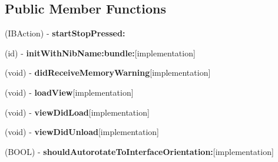 \subsection*{\-Public \-Member \-Functions}
\begin{DoxyCompactItemize}
\item 
\hypertarget{interface_main_interface_controller_a916520cdc378f7c0f7f7ee473eb60f58}{
(\-I\-B\-Action) -\/ {\bfseries start\-Stop\-Pressed\-:}}
\label{interface_main_interface_controller_a916520cdc378f7c0f7f7ee473eb60f58}

\item 
\hypertarget{interface_main_interface_controller_a595b629b86c323f97209d11c70c09a69}{
(id) -\/ {\bfseries init\-With\-Nib\-Name\-:bundle\-:}{\ttfamily  \mbox{[}implementation\mbox{]}}}
\label{interface_main_interface_controller_a595b629b86c323f97209d11c70c09a69}

\item 
\hypertarget{interface_main_interface_controller_a4504eba79f66a63ce5189380f79b3786}{
(void) -\/ {\bfseries did\-Receive\-Memory\-Warning}{\ttfamily  \mbox{[}implementation\mbox{]}}}
\label{interface_main_interface_controller_a4504eba79f66a63ce5189380f79b3786}

\item 
\hypertarget{interface_main_interface_controller_ad3fe7a8e815ed071258356198b39b311}{
(void) -\/ {\bfseries load\-View}{\ttfamily  \mbox{[}implementation\mbox{]}}}
\label{interface_main_interface_controller_ad3fe7a8e815ed071258356198b39b311}

\item 
\hypertarget{interface_main_interface_controller_ae18b039740558fd9c060a7cf0f8e658c}{
(void) -\/ {\bfseries view\-Did\-Load}{\ttfamily  \mbox{[}implementation\mbox{]}}}
\label{interface_main_interface_controller_ae18b039740558fd9c060a7cf0f8e658c}

\item 
\hypertarget{interface_main_interface_controller_a8e9eaeb4cd51c46a2da081dbf95df260}{
(void) -\/ {\bfseries view\-Did\-Unload}{\ttfamily  \mbox{[}implementation\mbox{]}}}
\label{interface_main_interface_controller_a8e9eaeb4cd51c46a2da081dbf95df260}

\item 
\hypertarget{interface_main_interface_controller_a85274419415a0c3e88b8517c977756b2}{
(\-B\-O\-O\-L) -\/ {\bfseries should\-Autorotate\-To\-Interface\-Orientation\-:}{\ttfamily  \mbox{[}implementation\mbox{]}}}
\label{interface_main_interface_controller_a85274419415a0c3e88b8517c977756b2}


\end{DoxyCompactItemize}
